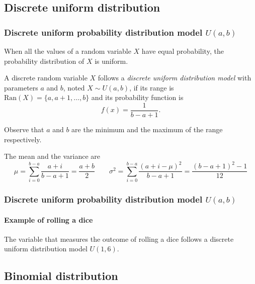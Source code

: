 \subsection{Discrete uniform distribution}

\begin{frame}
\frametitle{Discrete uniform probability distribution model $U(a,b)$}
When all the values of a random variable $X$ have equal probability, the probability distribution of $X$
is uniform.

\begin{definition}
A discrete random variable $X$ follows a \emph{discrete uniform distribution model} with parameters $a$ and $b$, noted 
$X\sim U(a,b)$, if its range is $\mbox{Ran}(X) = \{a, a+1, \ldots,b\}$ and its probability function is
\[f(x)=\frac{1}{b-a+1}.\]
\end{definition}

Observe that $a$ and $b$ are the minimum and the maximum of the range respectively. 

The mean and the variance are
\[
\mu = \sum_{i=0}^{b-a}\frac{a+i}{b-a+1}=\frac{a+b}{2} \qquad \sigma^2 =\sum_{i=0}^{b-a}\frac{(a+i-\mu)^2}{b-a+1}=
\frac{(b-a+1)^2-1}{12}
\]
\end{frame}


\begin{frame}
\frametitle{Discrete uniform probability distribution model $U(a,b)$}
\framesubtitle{Example of rolling a dice}
The variable that measures the outcome of rolling a dice follows a discrete uniform distribution model $U(1,6)$.
\begin{center}
\end{center}
\end{frame}


\subsection{Binomial distribution}

